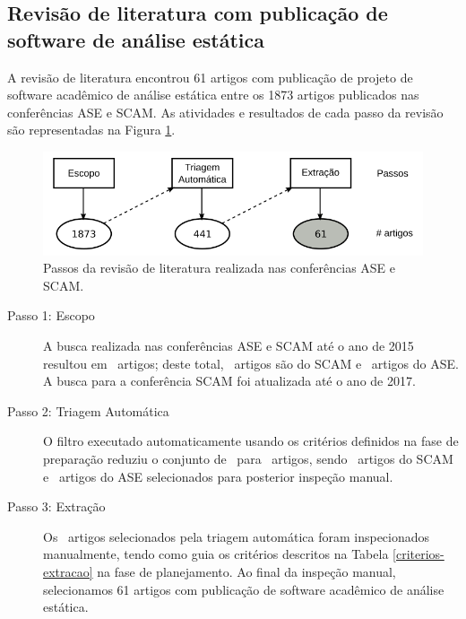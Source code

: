 \subsection{Revisão de literatura com publicação de software de análise estática}

A revisão de literatura encontrou 61 artigos com publicação de projeto de
software acadêmico de análise estática entre os 1873 artigos publicados nas
conferências ASE e SCAM. As atividades e resultados de cada passo da revisão
são representadas na Figura \ref{revisao-literatura}.

\begin{figure}[h]
  \center
  \includegraphics[scale=0.4]{imagens/revisao-literatura.png}
  \caption{Passos da revisão de literatura realizada nas conferências ASE e SCAM.}
  \label{revisao-literatura}
\end{figure}

\begin{description}

  \item [Passo 1: Escopo]

A busca realizada nas conferências ASE e SCAM até o ano de 2015 resultou em
\PapersCount \ artigos; deste total, \PapersSCAMCount \ artigos são do SCAM e \PapersASECount \ artigos do ASE.
A busca para a conferência SCAM foi atualizada até o ano de 2017.

  \item [Passo 2: Triagem Automática]

O filtro executado automaticamente usando os critérios definidos na fase de
preparação reduziu o conjunto de \PapersCount \ para  \PapersFilterCount \ artigos, sendo \PapersFilterSCAMCount \ artigos do SCAM e
\PapersFilterASECount \ artigos do ASE selecionados para posterior inspeção manual.

  \item [Passo 3: Extração]

Os \PapersFilterCount \ artigos selecionados pela triagem automática foram inspecionados manualmente, tendo como guia
os critérios descritos na Tabela \ref{criterios-extracao} na fase de
planejamento. Ao final da inspeção manual, selecionamos 61 artigos com publicação de
software acadêmico de análise estática.

\end{description}

